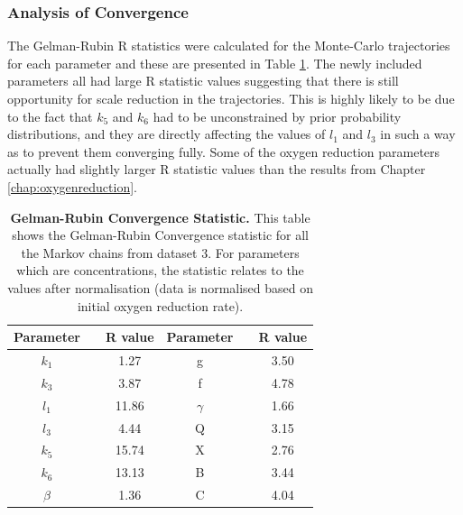 \subsubsection{Analysis of Convergence}
The Gelman-Rubin R statistics were calculated for the Monte-Carlo trajectories for each parameter and these are presented in Table \ref{tab:noRstat}. The newly included parameters all had large R statistic values suggesting that there is still opportunity for scale reduction in the trajectories. This is highly likely to be due to the fact that $k_5$ and $k_6$ had to be unconstrained by prior probability distributions, and they are directly affecting the values of $l_1$ and $l_3$ in such a way as to prevent them converging fully. Some of the oxygen reduction parameters actually had slightly larger R statistic values than the results from Chapter \ref{chap:oxygenreduction}.

\begin{table}[tbp]%
\renewcommand{\arraystretch}{1.5}
\begin{center}
\begin{tabular}{ccc|ccc}
\toprule
\textbf{Parameter} && \textbf{R value} & \textbf{Parameter} && \textbf{R value}\\
\midrule
$k_1$ && 1.27 & g && 3.50\\
$k_3$ && 3.87 & f && 4.78\\
$l_1$ && 11.86 & $\gamma$ && 1.66\\
$l_3$ && 4.44 & Q && 3.15\\
$k_5$ && 15.74 & X && 2.76\\
$k_6$ && 13.13 & B && 3.44\\
$\beta$ && 1.36 & C && 4.04 \\
\bottomrule
\end{tabular}
\end{center}
\caption[Gelman-Rubin Convergence Statistic]{{\bf Gelman-Rubin Convergence Statistic.} This table shows the Gelman-Rubin Convergence statistic for all the Markov chains from dataset 3. For parameters which are concentrations, the statistic relates to the values after normalisation (data is normalised based on initial oxygen reduction rate).
\label{tab:noRstat}}
\end{table}

